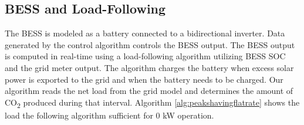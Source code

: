 \documentclass[conference,  usletter]{IEEEtran}
\begin{document}
\subsection{BESS and Load-Following}
The BESS is modeled as a battery connected to a bidirectional inverter. Data generated by the control algorithm controls the BESS output. The BESS output is computed in real-time using a load-following algorithm utilizing  BESS SOC and the grid meter output. The algorithm charges the battery when excess solar power is exported to the grid and when the battery needs to be charged. Our algorithm reads the net load from the grid model and determines the amount of CO\textsubscript{2} produced during that interval. Algorithm \ref{alg:peakshavingflatrate} shows the load the following algorithm sufficient for 0 kW operation. 
\end{document}
